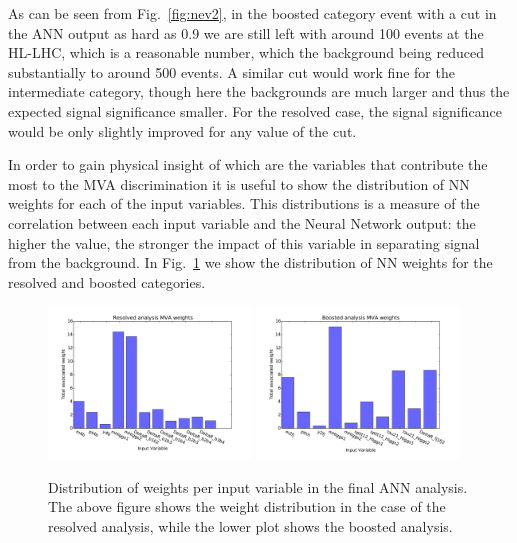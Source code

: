 As can be seen from Fig.~\ref{fig:nev2}, in the boosted category
event with a cut in the ANN output as hard as 0.9 we are still left
with around 100 events at the HL-LHC, which is a reasonable number,
which the background being reduced substantially to around
500 events.
%
A similar cut would work fine for the intermediate category, though here
the backgrounds are much larger and thus the expected signal significance smaller.
%
For the resolved case, the signal significance would be only slightly
improved for any value of the cut.

In order to gain physical insight of which are the variables that
contribute the most to the MVA discrimination it is useful
to show the distribution of NN weights for each of the
input variables.
%
This distributions is a measure of the correlation between
each input variable and the Neural Network output: the higher
the value, the stronger the impact of this variable in
separating signal from the background.
%
In Fig.~\ref{fig:nnweights} we show
the distribution of NN weights for the resolved and boosted categories.

\begin{figure}[t]
\begin{center}
\includegraphics[width=0.48\textwidth]{plots/nnweights_res.pdf}
\includegraphics[width=0.48\textwidth]{plots/nnweights_boost.pdf}
\caption{\small Distribution of weights per input variable in the final ANN analysis. The above figure shows the weight distribution in the case of the resolved analysis, while the lower plot shows the boosted analysis.}
\label{fig:nnweights}
\end{center}
\end{figure}

